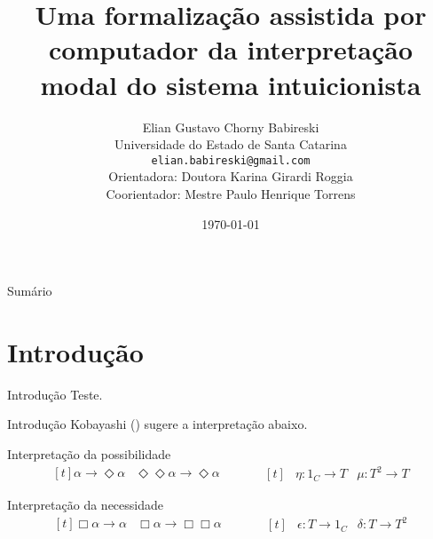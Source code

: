 \documentclass[table]{beamer}
\title[]{Uma formalização assistida por computador da interpretação modal do sistema intuicionista}
\author[Babireski]{
    Elian Gustavo Chorny Babireski\\\smallskip
    {\scriptsize Universidade do Estado de Santa Catarina \\\smallskip
    \vspace{-2mm}
    \texttt{elian.babireski@gmail.com}\\\medskip
    {Orientadora: Doutora Karina Girardi Roggia}\\
    {Coorientador: Mestre Paulo Henrique Torrens}
    }
}
\date{\today}
\def\\{}%
\begin{document}
\setlength{\abovedisplayskip}{-5pt}
\setlength{\belowdisplayskip}{0pt}
\setlength{\abovedisplayshortskip}{0pt}
\setlength{\belowdisplayshortskip}{0pt}

    \begin{frame}
        \titlepage
    \end{frame}

    \begin{frame}[allowframebreaks]{Sumário}
        \tableofcontents
    \end{frame}

    \section[]{Introdução}
    \begin{frame}{Introdução}
        Teste.
    \end{frame}

    \begin{frame}{Introdução}
        \justifying{}
        Kobayashi (\citeyear{Kobayashi}) sugere a interpretação abaixo.
        \begin{block}{Interpretação da possibilidade}
            \begin{equation*}
            \begin{aligned}[t]
                \alpha\to\Diamond\alpha& \\
                \Diamond\Diamond\alpha\to\Diamond\alpha&
            \end{aligned}
            \qquad
            \begin{aligned}[t]
                &\eta\mathrel{\colon}1_{C}\to T\\
                &\mu\mathrel{\colon}T^2\to T
            \end{aligned}
            \end{equation*}
        \end{block}

        \begin{block}{Interpretação da necessidade}
            \begin{equation*}
            \begin{aligned}[t]
                \Box\alpha\to\alpha& \\
                \Box\alpha\to\Box\Box\alpha&
            \end{aligned}
            \qquad
            \begin{aligned}[t]
                &\epsilon\mathrel{\colon}T\to 1_{C}\\
                &\delta\mathrel{\colon}T\to T^2
            \end{aligned}
            \end{equation*}
        \end{block}
    \end{frame}
\end{document}
